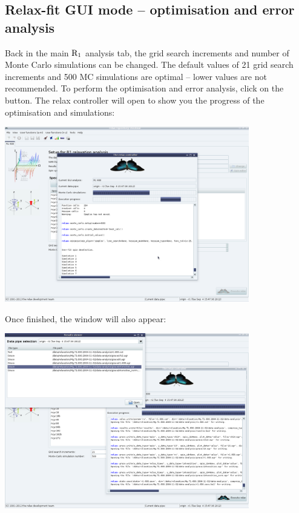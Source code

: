 
\subsection{Relax-fit GUI mode -- optimisation and error analysis}

Back in the main $\mathrm{R}_1$ analysis tab, the grid search increments and number of Monte Carlo simulations can be changed.  The default values of 21 grid search increments and 500 MC simulations are optimal -- lower values are not recommended.  To perform the optimisation and error analysis, click on the  button.  The relax controller will open to show you the progress of the optimisation and simulations:

\begin{minipage}[h]{\linewidth}
\centerline{\includegraphics[width=0.8\textwidth, bb=14 14 1415 1019]{graphics/screenshots/r1_analysis/mc_sim}}
\end{minipage}

Once finished, the  window will also appear:

\begin{minipage}[h]{\linewidth}
\centerline{\includegraphics[width=0.8\textwidth, bb=14 14 1415 1019]{graphics/screenshots/r1_analysis/fin}}
\end{minipage}

